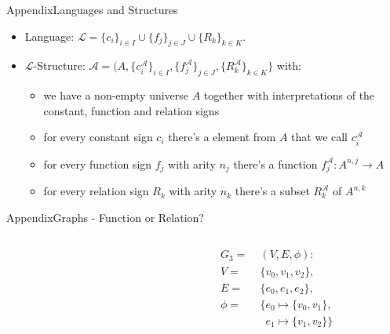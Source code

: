 \begin{frame}[allowframebreaks]{Appendix}{Languages and Structures}
  \begin{itemize}
    \item \alert{Language:} ${\mathcal{L}}=\{c_{i}\}_{i\in I}\cup\{f_{j}\}_{j\in J}\cup\{R_{k}\}_{k\in K}.$
    \item \alert{$\mathcal{L}$-Structure:} $\mathcal{A}=(A,\{c_{i}^{\mathcal{A}}\}_{i\in I},\{f_{j}^{\mathcal{A}}\}_{j\in J},\{R_{k}^{\mathcal{A}}\}_{k\in K}\}$ with:
    \begin{itemize}
      \item we have a non-empty \alert{universe} $A$ together with interpretations of the \alert{constant}, \alert{function} and \alert{relation} signs
      \item for every \alert{constant sign} $c_i$ there's a element from $A$ that we call $c_i^{\mathcal{A}}$
      \item for every \alert{function sign} $f_j$ with arity $n_j$ there's a function $f_j^{\mathcal{A}}: A^{n, j} \rightarrow A$
      \item for every \alert{relation sign} $R_k$ with arity $n_k$ there's a subset $R_k^{\mathcal{A}}$ of $A^{n, k}$
    \end{itemize}
  \end{itemize}
\end{frame}

\begin{frame}[allowframebreaks]{Appendix}{Graphs - Function or Relation?}
  \begin{columns}
    \begin{column}{0.6\textwidth}
    \end{column}
    \begin{column}{0.4\textwidth}
      \begin{align*}
        G_3 =\;&\left(V,E,\phi\right):\\
        V =\;&\{v_0, v_1, v_2\}, \\
        E =\;&\{e_0, e_1, e_{2} \}, \\
        \phi = &\{e_0 \mapsto \{v_0, v_1\},\\ 
               &\enspace e_1 \mapsto  \{v_1, v_2\}\} 
      \end{align*}
    \end{column}
  \end{columns}
\end{frame}
